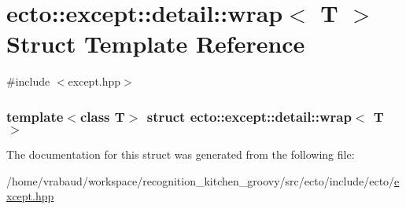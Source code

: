 \hypertarget{structecto_1_1except_1_1detail_1_1wrap}{\section{ecto\-:\-:except\-:\-:detail\-:\-:wrap$<$ \-T $>$ \-Struct \-Template \-Reference}
\label{structecto_1_1except_1_1detail_1_1wrap}
}


{\ttfamily \#include $<$except.\-hpp$>$}

\subsubsection*{template$<$class T$>$ struct ecto\-::except\-::detail\-::wrap$<$ T $>$}



\-The documentation for this struct was generated from the following file\-:\begin{DoxyCompactItemize}
\item 
/home/vrabaud/workspace/recognition\-\_\-kitchen\-\_\-groovy/src/ecto/include/ecto/\hyperlink{except_8hpp}{except.\-hpp}\end{DoxyCompactItemize}
